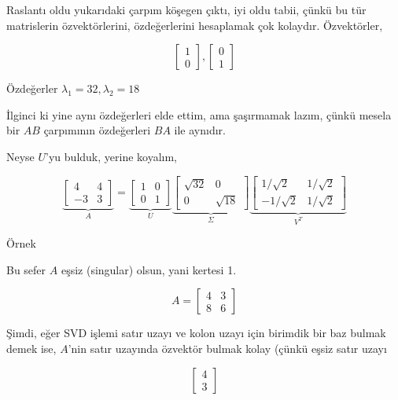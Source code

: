 \documentclass[12pt,fleqn]{article}\usepackage{../../common}
\begin{document}
Raslantı oldu yukarıdaki çarpım köşegen çıktı, iyi oldu tabii, çünkü bu tür
matrislerin özvektörlerini, özdeğerlerini hesaplamak çok
kolaydır. Özvektörler, 

$$ 
\left[\begin{array}{r}
1 \\ 0
\end{array}\right],
\left[\begin{array}{r}
0 \\ 1
\end{array}\right]
 $$

Özdeğerler $\lambda_1 = 32, \lambda_2 = 18$

İlginci ki yine aynı özdeğerleri elde ettim, ama şaşırmamak lazım, çünkü
mesela bir $AB$ çarpımının özdeğerleri $BA$ ile aynıdır. 

Neyse $U$'yu bulduk, yerine koyalım, 

$$ 
\underbrace{
\left[\begin{array}{rr}
4 & 4 \\ -3 & 3
\end{array}\right] 
}_{A}
=
\underbrace{
\left[\begin{array}{rr}
1 & 0 \\ 0 & 1 
\end{array}\right]
}_{U}
\underbrace{
\left[\begin{array}{rr}
\sqrt{ 32} & 0 \\ 0 & \sqrt{ 18}
\end{array}\right]
}_{\Sigma}
\underbrace{
\left[\begin{array}{rr}
1/\sqrt{ 2} & 1/\sqrt{ 2} \\ -1/\sqrt{ 2} & 1/\sqrt{ 2}
\end{array}\right]
}_{V^T}
 $$

Örnek 

Bu sefer $A$ eşsiz (singular) olsun, yani kertesi 1. 

$$ A = \left[\begin{array}{rr}
4 & 3 \\ 8 & 6
\end{array}\right] $$

Şimdi, eğer SVD işlemi satır uzayı ve kolon uzayı için birimdik bir baz
bulmak demek ise, $A$'nin satır uzayında özvektör bulmak kolay (çünkü
eşsiz satır uzayı

$$ 
\left[\begin{array}{r}
4 \\ 3
\end{array}\right]
 $$
\end{document}
